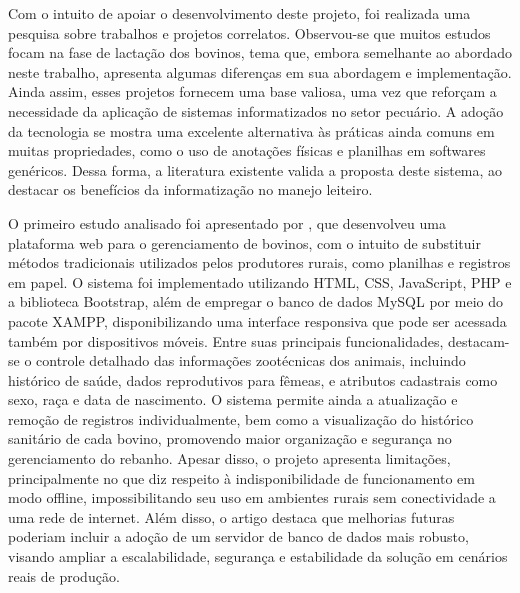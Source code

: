 Com o intuito de apoiar o desenvolvimento deste projeto, foi realizada uma pesquisa sobre trabalhos e projetos correlatos. Observou-se que muitos estudos focam na fase de lactação dos bovinos, tema que, embora semelhante ao abordado neste trabalho, apresenta algumas diferenças em sua abordagem e implementação. Ainda assim, esses projetos fornecem uma base valiosa, uma vez que reforçam a necessidade da aplicação de sistemas informatizados no setor pecuário. A adoção da tecnologia se mostra uma excelente alternativa às práticas ainda comuns em muitas propriedades, como o uso de anotações físicas e planilhas em softwares genéricos. Dessa forma, a literatura existente valida a proposta deste sistema, ao destacar os benefícios da informatização no manejo leiteiro.

O primeiro estudo analisado foi apresentado por \cite{SCHAFFER2021}, que desenvolveu uma plataforma web para o gerenciamento de bovinos, com o intuito de substituir métodos tradicionais utilizados pelos produtores rurais, como planilhas e registros em papel. O sistema foi implementado utilizando HTML, CSS, JavaScript, PHP e a biblioteca Bootstrap, além de empregar o banco de dados MySQL por meio do pacote XAMPP, disponibilizando uma interface responsiva que pode ser acessada também por dispositivos móveis. Entre suas principais funcionalidades, destacam-se o controle detalhado das informações zootécnicas dos animais, incluindo histórico de saúde, dados reprodutivos para fêmeas, e atributos cadastrais como sexo, raça e data de nascimento. O sistema permite ainda a atualização e remoção de registros individualmente, bem como a visualização do histórico sanitário de cada bovino, promovendo maior organização e segurança no gerenciamento do rebanho. Apesar disso, o projeto apresenta limitações, principalmente no que diz respeito à indisponibilidade de funcionamento em modo offline, impossibilitando seu uso em ambientes rurais sem conectividade a uma rede de internet. Além disso, o artigo destaca que melhorias futuras poderiam incluir a adoção de um servidor de banco de dados mais robusto, visando ampliar a escalabilidade, segurança e estabilidade da solução em cenários reais de produção.

